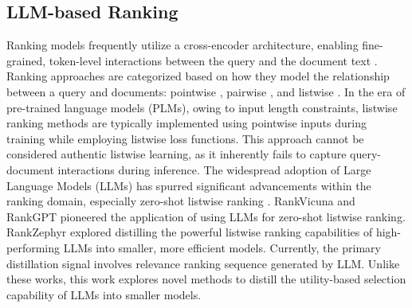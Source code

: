 \subsection{LLM-based Ranking} 
Ranking models frequently utilize a cross-encoder architecture, enabling fine-grained, token-level interactions between the query and the document text \cite{guo2019matchzoo}. 
Ranking approaches are categorized based on how they model the relationship between a query and documents: pointwise \cite{nogueira2019multi, nogueira2020document}, pairwise \cite{pradeep2021expando, burges2005learning}, and listwise \cite{cao2007learning, wang2018lambdaloss, gao2021rethink, zhuang2023rankt5}.  
In the era of pre-trained language models (PLMs), owing to input length constraints, listwise ranking methods are typically implemented using pointwise inputs during training while employing listwise loss functions. 
This approach cannot be considered authentic listwise learning, as it inherently fails to capture query-document interactions during inference. 
The widespread adoption of Large Language Models (LLMs) has spurred significant advancements within the ranking domain, especially zero-shot listwise ranking \cite{liu2025leveraging, reddy2024first, pradeep2023rankzephyr, ren2025self}. 
RankVicuna \cite{pradeep2023rankvicuna} and RankGPT \cite{sun2023chatgpt} pioneered the application of using LLMs for zero-shot listwise ranking. 
RankZephyr \cite{pradeep2023rankzephyr} explored distilling the powerful listwise ranking capabilities of high-performing LLMs into smaller, more efficient models. 
Currently, the primary distillation signal involves relevance ranking sequence generated by LLM. 
Unlike these works, this work explores novel methods to distill the utility-based selection capability of LLMs into smaller models. 


